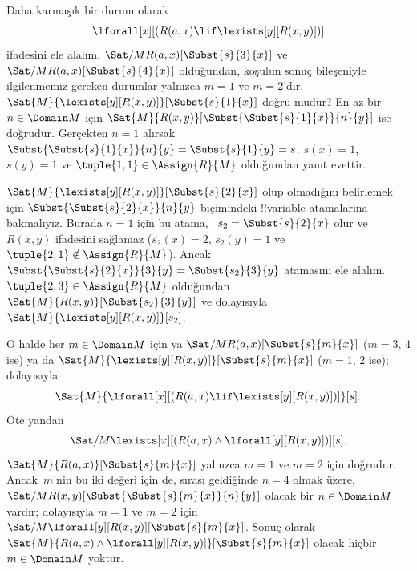 \begin{ex}

Daha karmaşık bir durum olarak
\[
\lforall[x][(R(a,x) \lif \lexists[y][R(x,y)])]
\]
ifadesini ele alalım. $\Sat/{M}{R(a,x)}[\Subst{s}{3}{x}]$ ve
$\Sat/{M}{R(a,x)}[\Subst{s}{4}{x}]$ olduğundan, koşulun sonuç
bileşeniyle ilgilenmemiz gereken durumlar yalnızca $m = 1$ ve
$m = 2$'dir. $\Sat{M}{\lexists[y][R(x,y)]}[\Subst{s}{1}{x}]$ doğru
mudur? En az bir $n \in \Domain M$ için
$\Sat{M}{R(x,y)}[\Subst{\Subst{s}{1}{x}}{n}{y}]$ ise doğrudur. Gerçekten
$n = 1$ alırsak $\Subst{\Subst{s}{1}{x}}{n}{y} = \Subst{s}{1}{y} =
s$. $s(x) = 1$, $s(y) = 1$ ve $\tuple{1,1} \in \Assign{R}{M}$
olduğundan yanıt evettir.

$\Sat{M}{\lexists[y][R(x,y)]}[\Subst{s}{2}{x}]$ olup olmadığını
belirlemek için $\Subst{\Subst{s}{2}{x}}{n}{y}$ biçimindeki
!!{variable} atamalarına bakmalıyız. Burada $n = 1$ için bu atama,
~$s_2 = \Subst{s}{2}{x}$ olur ve $R(x,y)$ ifadesini sağlamaz
($s_2(x) = 2$, $s_2(y) = 1$ ve $\tuple{2,1}\notin \Assign{R}{M}$).
Ancak $\Subst{\Subst{s}{2}{x}}{3}{y} = \Subst{s_2}{3}{y}$ atamasını
ele alalım. $\tuple{2,3} \in \Assign{R}{M}$ olduğundan
$\Sat{M}{R(x,y)}[\Subst{s_2}{3}{y}]$ ve dolayısıyla
$\Sat{M}{\lexists[y][R(x,y)]}[s_2]$.

O halde her $m \in \Domain M$ için ya
$\Sat/{M}{R(a,x)}[\Subst{s}{m}{x}]$ ($m = 3$, $4$ ise) ya da
$\Sat{M}{\lexists[y][R(x,y)]}[\Subst{s}{m}{x}]$ ($m = 1$, $2$ ise);
dolayısıyla
\[
\Sat{M}{\lforall[x][(R(a,x) \lif \lexists[y][R(x,y)])]}[s].
\]
Öte yandan
\[
\Sat/{M}{\lexists[x][(R(a,x) \land \lforall[y][R(x,y)])]}[s].
\]
$\Sat{M}{R(a,x)}[\Subst{s}{m}{x}]$ yalnızca $m = 1$ ve $m = 2$ için
doğrudur. Ancak~$m$'nin bu iki değeri için de, sırası geldiğinde
$n = 4$ olmak üzere, $\Sat/{M}{R(x,y)}[\Subst{\Subst{s}{m}{x}}{n}{y}]$
olacak bir $n \in \Domain M$ vardır; dolayısıyla $m = 1$ ve $m = 2$
için $\Sat/{M}{\lforall[y][R(x,y)]}[\Subst{s}{m}{x}]$. Sonuç olarak
$\Sat{M}{R(a,x) \land \lforall[y][R(x,y)]}[\Subst{s}{m}{x}]$ olacak
hiçbir $m \in \Domain M$ yoktur.
\end{ex}

